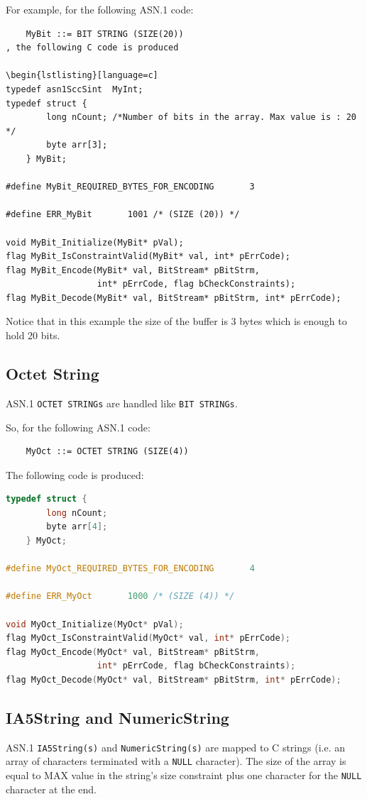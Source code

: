 \documentclass[11pt]{book}
\begin{document}
      For example, for the following ASN.1 code:

\begin{lstlisting}
	MyBit ::= BIT STRING (SIZE(20))
, the following C code is produced

\begin{lstlisting}[language=c]
typedef asn1SccSint  MyInt;
typedef struct {
        long nCount; /*Number of bits in the array. Max value is : 20 */
        byte arr[3];
    } MyBit;

#define MyBit_REQUIRED_BYTES_FOR_ENCODING		3

#define ERR_MyBit		1001 /* (SIZE (20)) */

void MyBit_Initialize(MyBit* pVal);
flag MyBit_IsConstraintValid(MyBit* val, int* pErrCode);
flag MyBit_Encode(MyBit* val, BitStream* pBitStrm, 
                  int* pErrCode, flag bCheckConstraints);
flag MyBit_Decode(MyBit* val, BitStream* pBitStrm, int* pErrCode);
\end{lstlisting}

      Notice that in this example the size of the buffer is 3 bytes 
      which is enough to hold 20 bits.


      \subsection{Octet String}
      ASN.1 \texttt{OCTET STRINGs} are handled like \texttt{BIT STRINGs}.
      
      So, for the following ASN.1 code:

\begin{lstlisting}
	MyOct ::= OCTET STRING (SIZE(4))
\end{lstlisting}

      The following code is produced:

\begin{lstlisting}[language=c]
typedef struct {
        long nCount;
        byte arr[4];
    } MyOct;

#define MyOct_REQUIRED_BYTES_FOR_ENCODING		4

#define ERR_MyOct		1000 /* (SIZE (4)) */

void MyOct_Initialize(MyOct* pVal);
flag MyOct_IsConstraintValid(MyOct* val, int* pErrCode);
flag MyOct_Encode(MyOct* val, BitStream* pBitStrm, 
                  int* pErrCode, flag bCheckConstraints);
flag MyOct_Decode(MyOct* val, BitStream* pBitStrm, int* pErrCode);
\end{lstlisting}

      \subsection{IA5String and NumericString}
      ASN.1 \texttt{IA5String(s)} and \texttt{NumericString(s)} are mapped to C strings 
      (i.e. an array of characters terminated with a \texttt{NULL} character). 
      The size of the array is equal to MAX value in the string’s size 
      constraint plus one character for the \texttt{NULL} character at the end.
\end{document}
